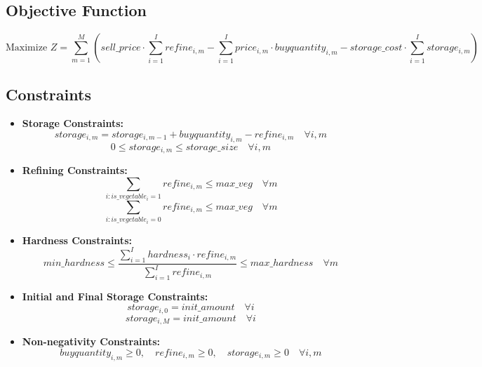 \documentclass{article}
\begin{document}
\subsection*{Objective Function}
\[
\text{Maximize } Z = \sum_{m=1}^{M} \left( sell\_price \cdot \sum_{i=1}^{I} refine_{i,m} - \sum_{i=1}^{I} price_{i,m} \cdot buyquantity_{i,m} - storage\_cost \cdot \sum_{i=1}^{I} storage_{i,m} \right)
\]

\subsection*{Constraints}
\begin{itemize}
    \item \textbf{Storage Constraints:}
    \[
    storage_{i,m} = storage_{i,m-1} + buyquantity_{i,m} - refine_{i,m} \quad \forall i, m
    \]
    \[
    0 \leq storage_{i,m} \leq storage\_size \quad \forall i, m
    \]
    
    \item \textbf{Refining Constraints:}
    \[
    \sum_{i : is\_vegetable_i = 1} refine_{i,m} \leq max\_veg \quad \forall m
    \]
    \[
    \sum_{i : is\_vegetable_i = 0} refine_{i,m} \leq max\_veg \quad \forall m
    \]
    
    \item \textbf{Hardness Constraints:}
    \[
    min\_hardness \leq \frac{\sum_{i=1}^{I} hardness_{i} \cdot refine_{i,m}}{\sum_{i=1}^{I} refine_{i,m}} \leq max\_hardness \quad \forall m
    \]
    
    \item \textbf{Initial and Final Storage Constraints:}
    \[
    storage_{i,0} = init\_amount \quad \forall i
    \]
    \[
    storage_{i,M} = init\_amount \quad \forall i
    \]
    
    \item \textbf{Non-negativity Constraints:}
    \[
    buyquantity_{i,m} \geq 0, \quad refine_{i,m} \geq 0, \quad storage_{i,m} \geq 0 \quad \forall i, m
    \]
\end{itemize}
\end{document}
